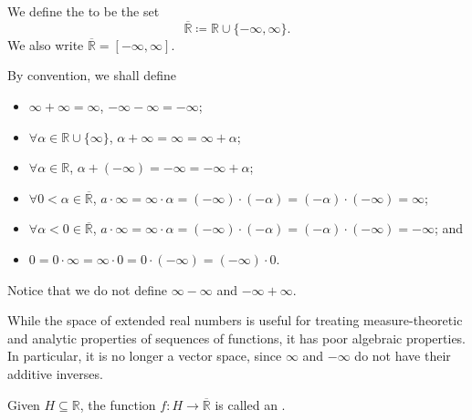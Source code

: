 \documentclass[notoc,notitlepage]{tufte-book}
\begin{document}
\begin{defn}\label{defn:extended_real_numbers}
  We define the  to be the set
  \begin{equation*}
    \overline{\mathbb{R}} \coloneqq \mathbb{R} \cup \{ -\infty, \infty \}.
  \end{equation*}
  We also write $\overline{\mathbb{R}} = [-\infty, \infty]$.

  By convention, we shall define
  \begin{itemize}
    \item $\infty + \infty = \infty$, $-\infty - \infty = -\infty$;
    \item $\forall \alpha \in \mathbb{R} \cup \{ \infty \}$, $\alpha + \infty =
      \infty = \infty + \alpha$;
    \item $\forall \alpha \in \mathbb{R}$, $\alpha + (-\infty) = -\infty =
      -\infty + \alpha$;
    \item $\forall 0 < \alpha \in \overline{\mathbb{R}}$, $a \cdot \infty =
      \infty \cdot \alpha = (-\infty) \cdot (-\alpha) = (-\alpha) \cdot
      (-\infty) = \infty$;
    \item $\forall \alpha < 0 \in \overline{\mathbb{R}}$, $a \cdot \infty =
      \infty \cdot \alpha = (-\infty) \cdot (-\alpha) = (-\alpha) \cdot
      (-\infty) = -\infty$; and
    \item $0 = 0 \cdot \infty = \infty \cdot 0 = 0 \cdot (-\infty) = (-\infty)
      \cdot 0$.
  \end{itemize}
\end{defn}

\begin{warning}
  Notice that we do not define $\infty - \infty$ and $-\infty + \infty$.
\end{warning}

\begin{note}
  While the space of extended real numbers is useful for treating
  measure-theoretic and analytic properties of sequences of functions, it has
  poor algebraic properties. In particular, it is no longer a vector space,
  since $\infty$ and $-\infty$ do not have their additive inverses.
\end{note}

\begin{defn}\label{defn:extended_real_valued_function}
  Given $H \subseteq \mathbb{R}$, the function $f : H \to \overline{\mathbb{R}}$ 
  is called an .
\end{defn}
\end{document}
